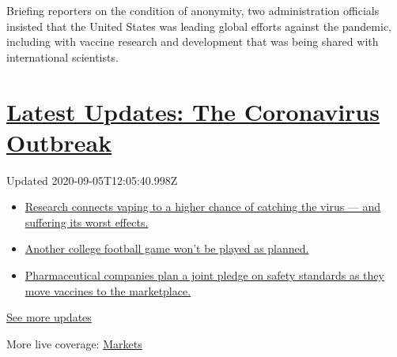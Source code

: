 Briefing reporters on the condition of anonymity, two administration
officials insisted that the United States was leading global efforts
against the pandemic, including with vaccine research and development
that was being shared with international scientists.

\hypertarget{latest-updates-the-coronavirus-outbreak}{%
\section{\texorpdfstring{\href{https://www.nytimes3xbfgragh.onion/2020/09/04/world/covid-19-coronavirus.html?action=click\&pgtype=Article\&state=default\&region=MAIN_CONTENT_1\&context=storylines_live_updates}{Latest
Updates: The Coronavirus
Outbreak}}{Latest Updates: The Coronavirus Outbreak}}\label{latest-updates-the-coronavirus-outbreak}}

Updated 2020-09-05T12:05:40.998Z

\begin{itemize}
\tightlist
\item
  \href{https://www.nytimes3xbfgragh.onion/2020/09/04/world/covid-19-coronavirus.html?action=click\&pgtype=Article\&state=default\&region=MAIN_CONTENT_1\&context=storylines_live_updates\#link-1654f6ad}{Research
  connects vaping to a higher chance of catching the virus --- and
  suffering its worst effects.}
\item
  \href{https://www.nytimes3xbfgragh.onion/2020/09/04/world/covid-19-coronavirus.html?action=click\&pgtype=Article\&state=default\&region=MAIN_CONTENT_1\&context=storylines_live_updates\#link-52e4198a}{Another
  college football game won't be played as planned.}
\item
  \href{https://www.nytimes3xbfgragh.onion/2020/09/04/world/covid-19-coronavirus.html?action=click\&pgtype=Article\&state=default\&region=MAIN_CONTENT_1\&context=storylines_live_updates\#link-181cef0}{Pharmaceutical
  companies plan a joint pledge on safety standards as they move
  vaccines to the marketplace.}
\end{itemize}

\href{https://www.nytimes3xbfgragh.onion/2020/09/04/world/covid-19-coronavirus.html?action=click\&pgtype=Article\&state=default\&region=MAIN_CONTENT_1\&context=storylines_live_updates}{See
more updates}

More live coverage:
\href{https://www.nytimes3xbfgragh.onion/live/2020/09/04/business/stock-market-today-coronavirus?action=click\&pgtype=Article\&state=default\&region=MAIN_CONTENT_1\&context=storylines_live_updates}{Markets}

